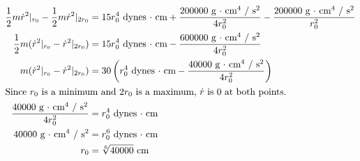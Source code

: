 \documentclass{esg8012pset}
\begin{document}
\begin{solution}
\begin{enumerate}[(a)]
\begin{align*}
  \frac{1}{2}m\dot r^2|_{r_0} - \frac{1}{2}m\dot r^2|_{2r_0} & =  15r_0^4\text{ dynes $\cdot$ cm} + \frac{200000\text{ g $\cdot$ cm$^4$ / s$^2$}}{4r_0^2} - \frac{200000\text{ g $\cdot$ cm$^4$ / s$^2$}}{r_0^2} \\
  \frac{1}{2}m(\dot r^2|_{r_0} - \dot r^2|_{2r_0}) & =  15r_0^4\text{ dynes $\cdot$ cm} - \frac{600000\text{ g $\cdot$ cm$^4$ / s$^2$}}{4r_0^2} \\
  m(\dot r^2|_{r_0} - \dot r^2|_{2r_0}) & =  30\left(r_0^4\text{ dynes $\cdot$ cm} - \frac{40000\text{ g $\cdot$ cm$^4$ / s$^2$}}{4r_0^2}\right) \\
  \intertext{Since $r_0$ is a minimum and $2r_0$ is a maximum, $\dot r$ is 0 at both points.}
  \frac{40000\text{ g $\cdot$ cm$^4$ / s$^2$}}{4r_0^2} & =  r_0^4\text{ dynes $\cdot$ cm} \\
  40000\text{ g $\cdot$ cm$^4$ / s$^2$} & =  r_0^6\text{ dynes $\cdot$ cm} \\
  r_0 & = \sqrt[6]{40000}\text{ cm}
  \end{align*}
\end{enumerate}
\end{solution}
\end{document}
